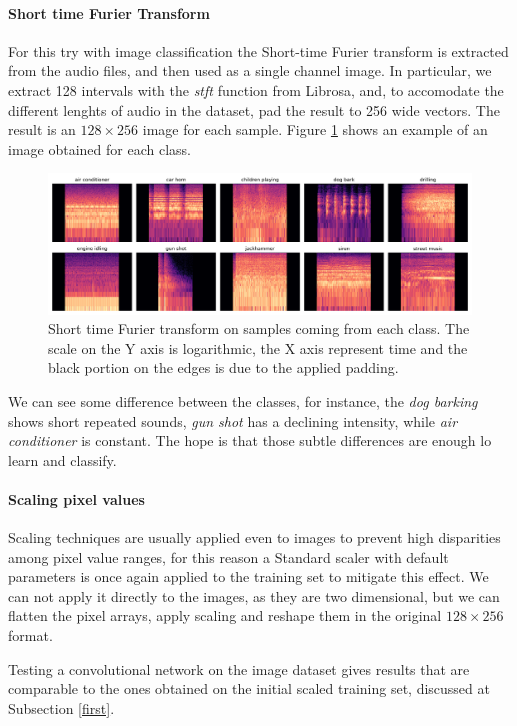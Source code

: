 \paragraph{Short time Furier Transform}
For this try with image classification the Short-time Furier transform 
is extracted from the audio files, and then used as a single channel image. 
In particular, we extract 128 intervals with the \emph{stft} function from Librosa, and, to accomodate 
the different lenghts of audio in the dataset, pad the result to 256 wide vectors.
The result is an $128 \times 256$ image for each sample. Figure \ref{img}
shows an example of an image obtained for each class.

\begin{figure}
    \includegraphics[width=\textwidth]{images/class_images.png}  
    \caption{Short time Furier transform on samples coming from each class.
    The scale on the Y axis is logarithmic, the X axis represent time and 
    the black portion on the edges is due to the applied padding.}  
    \label{img}
\end{figure}

We can see some difference between the classes, for instance, the \emph{dog barking}
shows short repeated sounds, \emph{gun shot} has a declining intensity, while \emph{air conditioner}
is constant. The hope is that those subtle differences are enough lo learn and classify.

\paragraph{Scaling pixel values}
Scaling techniques  are usually applied even to images to prevent high disparities 
among pixel value ranges, for this reason a Standard scaler with default parameters is 
once again applied to the training set to mitigate this effect.
We can not apply it directly to the images, as they are two dimensional, but we can 
flatten the pixel arrays, apply scaling and reshape them in the original $128 \times 256$ format.

Testing a convolutional network 
on the image dataset gives results that are comparable to the ones obtained on the initial scaled training 
set, discussed at Subsection \vref{first}.
\newpage